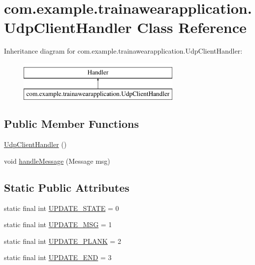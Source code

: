 \hypertarget{classcom_1_1example_1_1trainawearapplication_1_1_udp_client_handler}{}\section{com.\+example.\+trainawearapplication.\+Udp\+Client\+Handler Class Reference}
\label{classcom_1_1example_1_1trainawearapplication_1_1_udp_client_handler}
Inheritance diagram for com.\+example.\+trainawearapplication.\+Udp\+Client\+Handler\+:\begin{figure}[H]
\begin{center}
\leavevmode
\includegraphics[height=2.000000cm]{classcom_1_1example_1_1trainawearapplication_1_1_udp_client_handler}
\end{center}
\end{figure}
\subsection*{Public Member Functions}
\begin{DoxyCompactItemize}
\item 
\mbox{\hyperlink{classcom_1_1example_1_1trainawearapplication_1_1_udp_client_handler_ab5ff425dbf594d074ab709f2be441419}{Udp\+Client\+Handler}} ()
\item 
void \mbox{\hyperlink{classcom_1_1example_1_1trainawearapplication_1_1_udp_client_handler_a433f624fad2243aaed2e97f7f3cb8434}{handle\+Message}} (Message msg)
\end{DoxyCompactItemize}
\subsection*{Static Public Attributes}
\begin{DoxyCompactItemize}
\item 
static final int \mbox{\hyperlink{classcom_1_1example_1_1trainawearapplication_1_1_udp_client_handler_abb97ab46d1d8c23159f9ea1319425a5c}{U\+P\+D\+A\+T\+E\+\_\+\+S\+T\+A\+TE}} = 0
\item 
static final int \mbox{\hyperlink{classcom_1_1example_1_1trainawearapplication_1_1_udp_client_handler_ae0a5ca10db5db46916ca3a3acb7416b8}{U\+P\+D\+A\+T\+E\+\_\+\+M\+SG}} = 1
\item 
static final int \mbox{\hyperlink{classcom_1_1example_1_1trainawearapplication_1_1_udp_client_handler_ac9b4bdc66c35892883aa247a975ddca6}{U\+P\+D\+A\+T\+E\+\_\+\+P\+L\+A\+NK}} = 2
\item 
static final int \mbox{\hyperlink{classcom_1_1example_1_1trainawearapplication_1_1_udp_client_handler_ae78ce8486b0cfed7aa84f97336d66d99}{U\+P\+D\+A\+T\+E\+\_\+\+E\+ND}} = 3
\end{DoxyCompactItemize}
